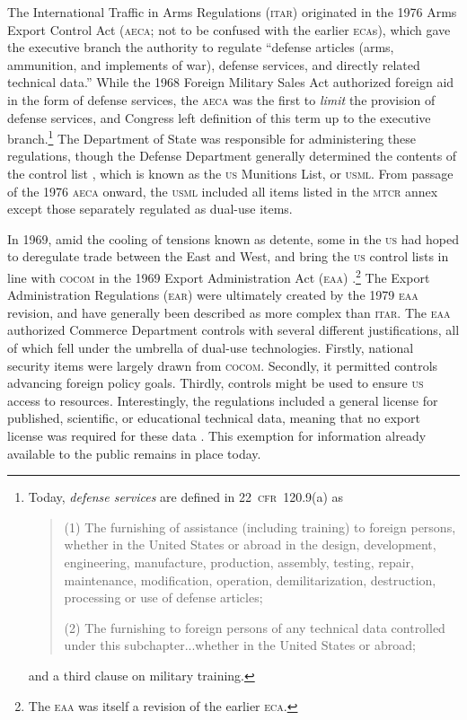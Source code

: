 \documentclass[12pt]{olfmemo}
\begin{document}
The International Traffic in Arms Regulations (\textsc{itar}) originated in the 1976 Arms Export Control Act (\textsc{aeca}; not to be confused with the earlier \textsc{eca}s), which gave the executive branch the authority to regulate ``defense articles (arms, ammunition, and implements of war), defense services, and directly related technical data.'' While the 1968 Foreign Military Sales Act authorized foreign aid in the form of defense services, the \textsc{aeca} was the first to \textit{limit} the provision of defense services, and Congress left definition of this term up to the executive branch.\footnote{Today, \textit{defense services} are defined in 22~\textsc{cfr}~120.9(a) as
\begin{quote}
(1) The furnishing of assistance (including training) to foreign persons, whether in the United States or abroad in the design, development, engineering, manufacture, production, assembly, testing, repair, maintenance, modification, operation, demilitarization, destruction, processing or use of defense articles;

(2) The furnishing to foreign persons of any technical data controlled under this subchapter...whether in the United States or abroad;
\end{quote}
and a third clause on military training.}
The Department of State was responsible for administering these regulations, though the Defense Department generally determined the contents of the control list \citep{NAP1987}, which is known as the \textsc{us} Munitions List, or \textsc{usml}. From passage of the 1976 \textsc{aeca} onward, the \textsc{usml} included all items listed in the \textsc{mtcr} annex except those separately regulated as dual-use items.

In 1969, amid the cooling of tensions known as detente, some in the \textsc{us} had hoped to deregulate trade between the East and West, and bring the \textsc{us} control lists in line with \textsc{cocom} in the 1969 Export Administration Act (\textsc{eaa}) \citep{NAP1987}.\footnote{The \textsc{eaa} was itself a revision of the earlier \textsc{eca}.} The Export Administration Regulations (\textsc{ear}) were ultimately created by the 1979 \textsc{eaa} revision, and have generally been described as more complex than \textsc{itar}. The \textsc{eaa} authorized Commerce Department controls with several different justifications, all of which fell under the umbrella of dual-use technologies. Firstly, national security items were largely drawn from \textsc{cocom}. Secondly, it permitted controls advancing foreign policy goals. Thirdly, controls might be used to ensure \textsc{us} access to resources. Interestingly, the regulations included a general license for published, scientific, or educational technical data, meaning that no export license was required for these data \citep{NAP1987}. This exemption for information already available to the public remains in place today.
\end{document}
